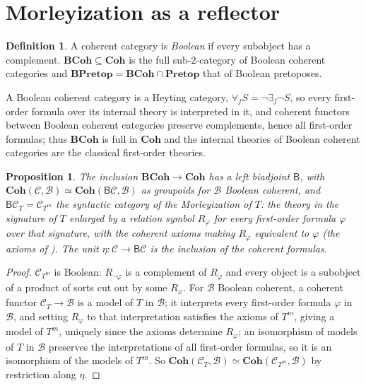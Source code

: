 \documentclass[11pt]{amsart}
\newtheorem{prop}[thm]{Proposition}
\theoremstyle{definition}
\newtheorem{defi}[thm]{Definition}
\newcommand{\Coh}{\mathbf{Coh}}
\newcommand{\BCoh}{\mathbf{BCoh}}
\newcommand{\Pretop}{\mathbf{Pretop}}
\newcommand{\BPretop}{\mathbf{BPretop}}
\newcommand{\BB}{\mathsf B}
\newcommand{\cC}{\mathcal C}
\begin{document}
\section{Morleyization as a reflector}\label{sec:morley}

\begin{defi}
A coherent category is \emph{Boolean} if every subobject has a
complement. $\BCoh\subseteq\Coh$ is the full sub-$2$-category of Boolean
coherent categories and $\BPretop=\BCoh\cap\Pretop$ that of Boolean
pretoposes.
\end{defi}

A Boolean coherent category is a Heyting category, $\forall_f S=\neg
\exists_f\neg S$, so every first-order formula over its internal theory
is interpreted in it, and coherent functors between Boolean coherent
categories preserve complements, hence all first-order formulas; thus
$\BCoh$ is full in $\Coh$ and the internal theories of Boolean coherent
categories are the classical first-order theories.

\begin{prop}\label{prop:reflector}
The inclusion $\BCoh\to\Coh$ has a left biadjoint $\BB$, with
$\Coh(\cC,\mathcal B)\simeq\Coh(\BB\cC,\mathcal B)$ as groupoids for
$\mathcal B$ Boolean coherent, and
$\BB\cC_T=\cC_{T^m}$ the syntactic category of the Morleyization of $T$:
the theory in the signature of $T$ enlarged by a relation symbol
$R_\varphi$ for every first-order formula $\varphi$ over that signature,
with the coherent axioms making $R_\varphi$ equivalent to $\varphi$
(the axioms of \cite[D1.5.13]{Elephant}). The unit $\eta\colon\cC\to\BB\cC$
is the inclusion of the coherent formulas.
\end{prop}
\begin{proof}
$\cC_{T^m}$ is Boolean: $R_{\neg\varphi}$ is a complement of $R_\varphi$
and every object is a subobject of a product of sorts cut out by some
$R_\varphi$. For $\mathcal B$ Boolean coherent, a coherent functor
$\cC_T\to\mathcal B$ is a model of $T$ in $\mathcal B$; it interprets
every first-order formula $\varphi$ in $\mathcal B$, and setting
$R_\varphi$ to that interpretation satisfies the axioms of $T^m$, giving
a model of $T^m$, uniquely since the axioms determine $R_\varphi$; an
isomorphism of models of $T$ in $\mathcal B$ preserves the
interpretations of all first-order formulas, so it is an isomorphism of
the models of $T^m$. So $\Coh(\cC_T,\mathcal B)\simeq
\Coh(\cC_{T^m},\mathcal B)$ by restriction along $\eta$.
\end{proof}
\end{document}
